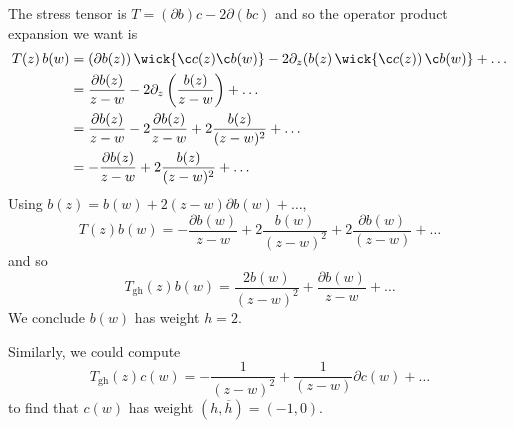 The stress tensor is $T = (\partial b) c  - 2 \partial (b c)$ and so the operator product expansion we want is
\begin{align}
  T(z)\, b(w) &= (\partial b(z)) \, \wick{\c c(z) \c b(w)} -2 \partial_z (b(z) \, \wick{\c c(z) ) \, \c b(w)} + \dots \\
	      &= \frac{\partial b(z)}{z - w} - 2 \partial_z \left( \frac{b(z)}{z - w} \right) + \dots \\
	      &= \frac{\partial b(z)}{z - w} - 2 \frac{\partial b(z)}{z - w} + 2 \frac{b(z)}{(z - w)^2} + \dots \\
	      &= - \frac{\partial b(z)}{z - w} + 2 \frac{b(z)}{(z - w)^2} + \dots
\end{align}
Using $b(z) = b(w) + 2 (z - w) \partial b(w) + \dots$, 
\begin{equation}
  T(z) b(w) = - \frac{\partial b(w)}{z - w} + 2 \frac{b(w)}{(z - w)^2} + 2 \frac{\partial b(w)}{(z - w)} + \dots
\end{equation}
and so 
\begin{equation}
  \boxed{T_{\text{gh}}(z) b(w) = \frac{2 b(w)}{(z - w)^2} + \frac{\partial b(w)}{z - w} + \dots }
\end{equation}
We conclude $b(w)$ has weight $h = 2$. 
\begin{exercise}
  Similarly, we could compute 
  \begin{equation}
    T_{\text{gh}}(z) c(w) = -\frac{1}{(z - w)^2} + \frac{1}{(z - w)} \partial c (w) + \dots
  \end{equation}
  to find that $c(w)$ has weight $(h, \overline{h}{}) = (-1, 0)$.
\end{exercise}
